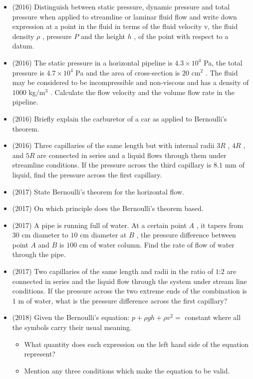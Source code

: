 \documentclass{article}
\begin{document}
\begin{itemize}
\item (2016)  Distinguish between static pressure, dynamic pressure and total pressure when applied to streamline or laminar fluid flow and write down expression at a point in the fluid in terms of the fluid velocity v, the fluid density $ \rho $ , pressure $ P$ and the height $ h$ , of the point with respect to a datum.  
\item (2016)  The static pressure in a horizontal pipeline is $ 4.3 \times 10^{4}$ Pa, the total pressure is $ 4.7 \times 10^{4}$ Pa and the area of cross-section is $ 20 $ cm$ ^{2}$ . The fluid may be considered to be incompressible and non-viscous and has a density of $ 1000$ kg$/$m$ ^{3}$ .  Calculate the flow velocity and the volume flow rate in the pipeline.
\item (2016)  Briefly explain the carburetor of a car as applied to Bernoulli’s theorem.
\item (2016)  Three capillaries of the same length but with internal radii $ 3R$ , $ 4R$ , and $ 5R$ are connected in series and a liquid flows through them under streamline conditions.  If the pressure across the third capillary is $ 8.1$ mm of liquid, find the pressure across the first capillary.
\item (2017)  State Bernoulli's theorem for the horizontal flow. 
\item (2017)  On which principle does the Bernoulli's theorem based. 
\item (2017)  A pipe is running full of water. At a certain point $ A$ , it tapers from $ 30$ cm diameter to $ 10$ cm diameter at $ B$ , the pressure difference between point $ A$ and $ B$ is $ 100$ cm of water column. Find the rate of flow of water through the pipe. 
\item (2017)  Two capillaries of the same length and radii in the ratio of $ 1$:$ 2$ are connected in series and the liquid flow through the system under stream line conditions. If the pressure across the two extreme ends of the combination is  $ 1$ m of water, what is the pressure difference across the first capillary?
\item (2018)  Given the Bernoulli’s equation: $ p+\rho gh+\rho v^{2}=$ constant where all the symbols carry their usual meaning.
 \begin{itemize}
\item What quantity does each expression on the left hand side of the equation represent? 
\item Mention any three conditions which make the equation to be valid. 
\end{itemize}

\end{itemize}
\end{document}
